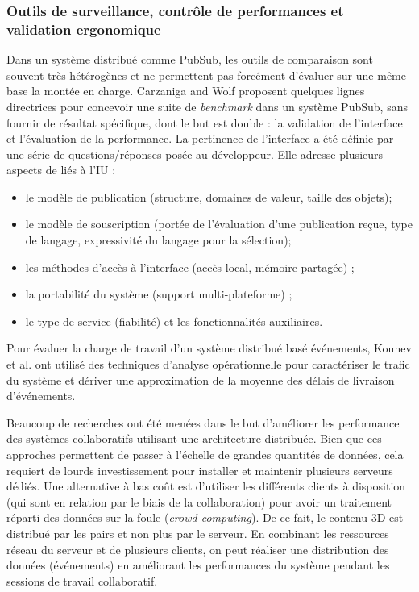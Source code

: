 \subsubsection{Outils de surveillance, contrôle de performances et validation ergonomique}
Dans un système distribué comme \gls{PubSub}, les outils de comparaison 
sont souvent très hétérogènes et ne permettent pas forcément d'évaluer sur une 
même base la montée en charge. 
Carzaniga and Wolf \cite{Carzaniga2002} proposent quelques 
lignes directrices pour concevoir une suite de \textit{benchmark} dans un système 
\gls{PubSub}, sans fournir de résultat spécifique, dont le but est double : la 
validation de l'interface et l'évaluation de la performance. 
La pertinence de l'interface a été définie par une série de questions/réponses 
posée au développeur. Elle adresse plusieurs aspects de liés à l'\gls{IU} : 
\begin{itemize}
	\item le modèle de publication (structure, domaines de valeur, taille des objets);
	\item le modèle de souscription (portée de l'évaluation d'une publication reçue, 
	type de langage, expressivité du langage pour la sélection);
	\item les méthodes d'accès à l'interface (accès local, mémoire partagée) ; 
	\item la portabilité du système (support multi-plateforme) ;
	\item le type de service (fiabilité) et les fonctionnalités auxiliaires. 
\end{itemize}

Pour évaluer la charge de travail d'un système distribué basé événements, 
Kounev et al. \cite{Kounev2008} ont utilisé des techniques d'analyse 
opérationnelle pour caractériser le trafic du système et dériver une approximation 
de la moyenne des délais de livraison d'événements. 

Beaucoup de recherches ont été menées dans le but d'améliorer les performance 
des systèmes collaboratifs utilisant une architecture distribuée. Bien que ces 
approches permettent de passer à l'échelle de grandes quantités de données, cela 
requiert de lourds investissement pour installer et maintenir plusieurs serveurs 
dédiés. Une alternative à bas coût est d'utiliser les différents clients à disposition 
(qui sont en relation par le biais de la collaboration) pour avoir un traitement réparti 
des données sur la foule (\textit{crowd computing})\cite{Li2015}. De ce fait, le 
contenu 3D est distribué par les pairs et non plus par le serveur. En combinant les 
ressources réseau du serveur et de plusieurs clients, on peut réaliser une 
distribution des données (événements) en améliorant les performances du 
système pendant les sessions de travail collaboratif. 




